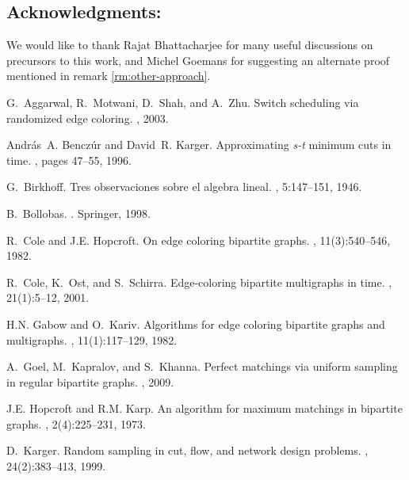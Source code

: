 \documentclass[11pt]{article}
\begin{document}
\newpage
\subsection*{Acknowledgments:} We would like to thank Rajat Bhattacharjee for many useful discussions on precursors to this work, and Michel Goemans for suggesting an alternate proof mentioned in remark \ref{rm:other-approach}.

\begin{thebibliography}{10}

G.~Aggarwal, R.~Motwani, D.~Shah, and A.~Zhu.
\newblock Switch scheduling via randomized edge coloring.
, 2003.

Andr{\'a}s~A. Bencz{\'u}r and David~R. Karger.
\newblock Approximating {\it s-t} minimum cuts in  time.
, pages 47--55, 1996.

G.~Birkhoff.
\newblock Tres observaciones sobre el algebra lineal.
, 5:147--151, 1946.

B.~Bollobas.
.
\newblock Springer, 1998.

R.~Cole and J.E. Hopcroft.
\newblock On edge coloring bipartite graphs.
, 11(3):540--546, 1982.

R.~Cole, K.~Ost, and S.~Schirra.
\newblock Edge-coloring bipartite multigraphs in {} time.
, 21(1):5--12, 2001.

H.N. Gabow and O.~Kariv.
\newblock Algorithms for edge coloring bipartite graphs and multigraphs.
, 11(1):117--129, 1982.

A.~Goel, M.~Kapralov, and S.~Khanna.
\newblock Perfect matchings via uniform sampling in regular bipartite graphs.
, 2009.

J.E. Hopcroft and R.M. Karp.
\newblock An  algorithm for maximum matchings in bipartite
  graphs.
, 2(4):225--231, 1973.

D.~Karger.
\newblock Random sampling in cut, flow, and network design problems.
,
  24(2):383--413, 1999.


\end{thebibliography}
\end{document}
